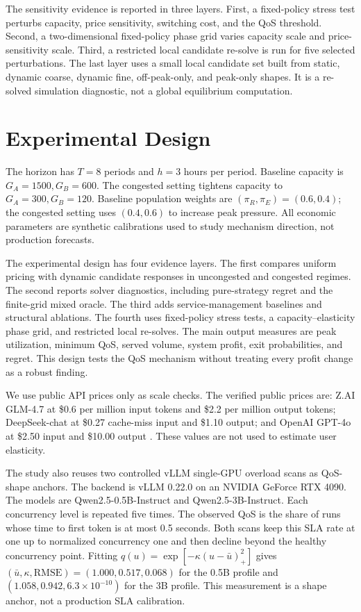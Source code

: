 \documentclass[11pt,a4paper]{article}
\begin{document}
The sensitivity evidence is reported in three layers. First, a fixed-policy stress test perturbs capacity, price sensitivity, switching cost, and the QoS threshold. Second, a two-dimensional fixed-policy phase grid varies capacity scale and price-sensitivity scale. Third, a restricted local candidate re-solve is run for five selected perturbations. The last layer uses a small local candidate set built from static, dynamic coarse, dynamic fine, off-peak-only, and peak-only shapes. It is a re-solved simulation diagnostic, not a global equilibrium computation.

\section{Experimental Design}
\label{sec:setup}

The horizon has $T=8$ periods and $h=3$ hours per period. Baseline capacity is $G_A=1500,G_B=600$. The congested setting tightens capacity to $G_A=300,G_B=120$. Baseline population weights are $(\pi_R,\pi_E)=(0.6,0.4)$; the congested setting uses $(0.4,0.6)$ to increase peak pressure. All economic parameters are synthetic calibrations used to study mechanism direction, not production forecasts.

The experimental design has four evidence layers. The first compares uniform pricing with dynamic candidate responses in uncongested and congested regimes. The second reports solver diagnostics, including pure-strategy regret and the finite-grid mixed oracle. The third adds service-management baselines and structural ablations. The fourth uses fixed-policy stress tests, a capacity--elasticity phase grid, and restricted local re-solves. The main output measures are peak utilization, minimum QoS, served volume, system profit, exit probabilities, and regret. This design tests the QoS mechanism without treating every profit change as a robust finding.

We use public API prices only as scale checks. The verified public prices are: Z.AI GLM-4.7 at \$0.6 per million input tokens and \$2.2 per million output tokens; DeepSeek-chat at \$0.27 cache-miss input and \$1.10 output; and OpenAI GPT-4o at \$2.50 input and \$10.00 output \cite{zaiPricing2026,deepseekPricing2026,openaiGpt4oPricing2026}. These values are not used to estimate user elasticity.

The study also reuses two controlled vLLM single-GPU overload scans as QoS-shape anchors. The backend is vLLM 0.22.0 on an NVIDIA GeForce RTX 4090. The models are Qwen2.5-0.5B-Instruct and Qwen2.5-3B-Instruct. Each concurrency level is repeated five times. The observed QoS is the share of runs whose time to first token is at most 0.5 seconds. Both scans keep this SLA rate at one up to normalized concurrency one and then decline beyond the healthy concurrency point. Fitting $q(u)=\exp[-\kappa(u-\bar u)^2_+]$ gives $(\bar u,\kappa,\mathrm{RMSE})=(1.000,0.517,0.068)$ for the 0.5B profile and $(1.058,0.942,6.3\times10^{-10})$ for the 3B profile. This measurement is a shape anchor, not a production SLA calibration.
\end{document}
